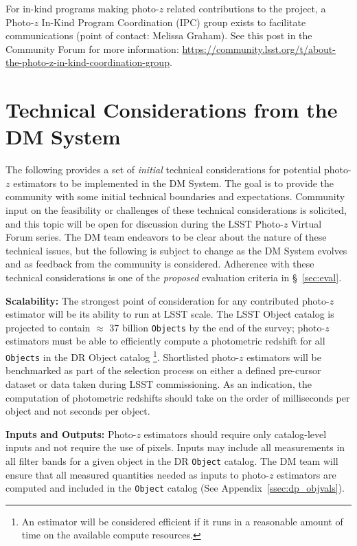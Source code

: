 \documentclass[DM,lsstdraft,toc]{lsstdoc}
\begin{document}
For in-kind programs making photo-$z$ related contributions to the project, a Photo-$z$ In-Kind Program Coordination (IPC) group exists to facilitate communications (point of contact: Melissa Graham). See this post in the Community Forum for more information: \url{https://community.lsst.org/t/about-the-photo-z-in-kind-coordination-group}.

\section{Technical Considerations from the DM System}\label{sec:dmcon}

The following provides a set of {\it initial} technical considerations for potential photo-$z$ estimators to be implemented in the DM System.
The goal is to provide the community with some initial technical boundaries and expectations. 
Community input on the feasibility or challenges of these technical considerations is solicited, and this topic will be open for discussion during the LSST Photo-$z$ Virtual Forum series.
The DM team endeavors to be clear about the nature of these technical issues, but the following is subject to change as the DM System evolves and as feedback from the community is considered. 
Adherence with these technical considerations is one of the {\it proposed} evaluation criteria in \S~\ref{sec:eval}.

\textbf{Scalability:}
The strongest point of consideration for any contributed  photo-$z$ estimator will be its ability to run at LSST scale. 
The LSST Object catalog is projected to contain $\approx$ 37 billion {\tt Objects} by the end of the survey;  photo-$z$ estimators must be able to efficiently compute a photometric redshift for all {\tt Objects} in the DR Object catalog \footnote{An estimator will be considered efficient if it runs in a reasonable amount of time on the available compute resources.}. 
Shortlisted photo-$z$ estimators will be benchmarked as part of the selection process on either a defined pre-cursor dataset or data taken during LSST commissioning.
As an indication, the computation of photometric redshifts should take on the order of milliseconds per object and not seconds per object.

\textbf{Inputs and Outputs:}
Photo-$z$ estimators should require only catalog-level inputs and not require the use of pixels. 
Inputs may include all measurements in all filter bands for a given object in the DR {\tt Object} catalog. 
The DM team will ensure that all measured quantities needed as inputs to photo-$z$ estimators are computed and included in the {\tt Object} catalog (See Appendix~\ref{ssec:dp_objvals}). 
\end{document}
